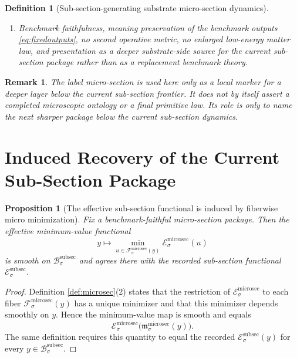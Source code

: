 \documentclass[11pt]{article}
\newcommand{\SubSectionBody}[1]{\mathcal B_{#1}^{\mathrm{subsec}}}
\newcommand{\SubSectionFunctional}[1]{\mathscr E_{#1}^{\mathrm{subsec}}}
\newcommand{\SubSectionShell}[1]{\mathcal Z_{#1}^{\mathrm{subsec}}}
\newcommand{\MicroSectionProj}[1]{\Pi_{#1}^{\mathrm{microsec}}}
\newcommand{\MicroSectionFiber}[2]{\mathcal F_{#1}^{\mathrm{microsec}}(#2)}
\newcommand{\MicroSectionSubMin}[1]{\mathfrak m_{#1}^{\mathrm{microsec}}}
\newcommand{\MicroSectionFunctional}[1]{\mathscr E_{#1}^{\mathrm{microsec}}}
\newcommand{\MicroSectionShell}[1]{\mathcal Z_{#1}^{\mathrm{microsec}}}
\newtheorem{definition}{Definition}
\newtheorem{proposition}{Proposition}
\newtheorem{remark}{Remark}
\begin{document}
\begin{definition}[Sub-section-generating substrate micro-section dynamics]
\begin{enumerate}
\[\begin{array}{l}
    \MicroSectionProj{\sigma}(u)\in\SubSectionShell{\sigma},\\[0.2em]
    \MicroSectionFunctional{\sigma}(u)
    =
    \displaystyle\min_{v\in\MicroSectionFiber{\sigma}{\MicroSectionProj{\sigma}(u)}}
    \MicroSectionFunctional{\sigma}(v)
    \end{array}
    \right\},
    \]
    and
    \[
    \MicroSectionProj{\sigma}\big|_{\MicroSectionShell{\sigma}}
    :
    \MicroSectionShell{\sigma}
    \xrightarrow{\cong}
    \SubSectionShell{\sigma}
    \]
    is a diffeomorphism.
    \item Benchmark faithfulness, meaning preservation of the benchmark outputs \eqref{eq:fixedoutputs}, no second operative metric, no enlarged low-energy matter law, and presentation as a deeper substrate-side source for the current sub-section package rather than as a replacement benchmark theory.
\end{enumerate}
\end{definition}

\begin{remark}
The label \emph{micro-section} is used here only as a local marker for a deeper layer below the current sub-section frontier. It does not by itself assert a completed microscopic ontology or a final primitive law. Its role is only to name the next sharper package below the current sub-section dynamics.
\end{remark}

\section{Induced Recovery of the Current Sub-Section Package}

\begin{proposition}[The effective sub-section functional is induced by fiberwise micro minimization]
\label{prop:functional}
Fix a benchmark-faithful micro-section package. Then the effective minimum-value functional
\[
y\longmapsto
\min_{u\in\MicroSectionFiber{\sigma}{y}}
\MicroSectionFunctional{\sigma}(u)
\]
is smooth on \(\SubSectionBody{\sigma}\) and agrees there with the recorded sub-section functional \(\SubSectionFunctional{\sigma}\).
\end{proposition}

\begin{proof}
Definition \ref{def:microsec}(2) states that the restriction of \(\MicroSectionFunctional{\sigma}\) to each fiber \(\MicroSectionFiber{\sigma}{y}\) has a unique minimizer and that this minimizer depends smoothly on \(y\). Hence the minimum-value map is smooth and equals
\[
\MicroSectionFunctional{\sigma}\bigl(\MicroSectionSubMin{\sigma}(y)\bigr).
\]
The same definition requires this quantity to equal the recorded \(\SubSectionFunctional{\sigma}(y)\) for every \(y\in\SubSectionBody{\sigma}\).
\end{proof}
\end{document}
